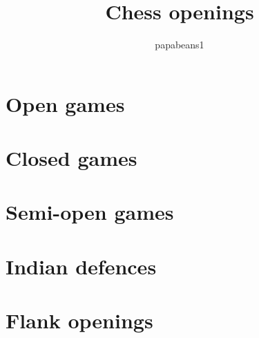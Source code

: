 \documentclass[a4paper,8pt]{extarticle}
\begin{document}
\author{papabeans1}
\title{Chess openings}
\section{Open games}

\section{Closed games}

\section{Semi-open games}

\section{Indian defences}

\section{Flank openings}

\end{document}
